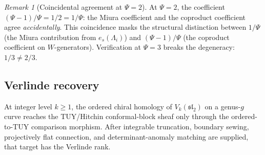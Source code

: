 \documentclass[11pt,reqno]{amsart}
\theoremstyle{definition}
\theoremstyle{remark}
\newtheorem{remark}[theorem]{Remark}
\numberwithin{equation}{section}
\begin{document}
\begin{remark}[Coincidental agreement at $\Psi = 2$]
\label{rem:psi-2-coincidence}
At $\Psi = 2$, the coefficient $(\Psi - 1)/\Psi = 1/2 = 1/\Psi$:
the Miura coefficient and the coproduct coefficient agree
\emph{accidentally}. This coincidence masks the structural
distinction between $1/\Psi$ (the Miura contribution from
$e_s(\Lambda_i)$) and $(\Psi - 1)/\Psi$ (the coproduct
coefficient on $W$-generators). Verification at $\Psi = 3$
breaks the degeneracy: $1/3 \neq 2/3$.
\end{remark}

\subsection{Verlinde recovery}

At integer level $k \geq 1$, the ordered chiral homology of
$V_k(\mathfrak{sl}_2)$ on a genus-$g$ curve reaches the
TUY/Hitchin conformal-block sheaf only through the ordered-to-TUY
comparison morphism.  After integrable truncation, boundary sewing,
projectively flat connection, and determinant-anomaly matching are
supplied, that target has the Verlinde rank.
\end{document}
